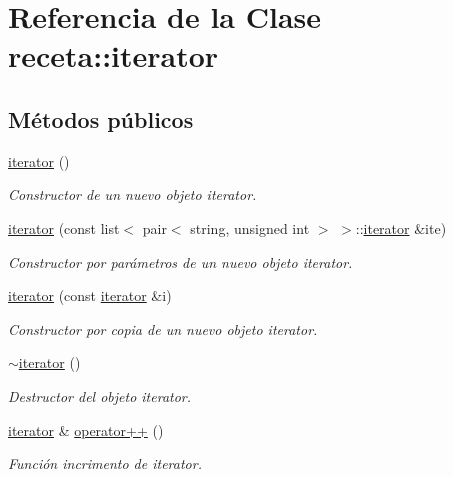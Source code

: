 \hypertarget{classreceta_1_1iterator}{}\section{Referencia de la Clase receta\+:\+:iterator}
\label{classreceta_1_1iterator}
\subsection*{Métodos públicos}
\begin{DoxyCompactItemize}
\item 
\hyperlink{classreceta_1_1iterator_a4cc712c12bb8e7ac1488e07def470a0b}{iterator} ()
\begin{DoxyCompactList}\small\item\em Constructor de un nuevo objeto iterator. \end{DoxyCompactList}\item 
\hyperlink{classreceta_1_1iterator_a3372167925372df4a8895b4337b8dcbf}{iterator} (const list$<$ pair$<$ string, unsigned int $>$ $>$\+::\hyperlink{classreceta_1_1iterator}{iterator} \&ite)
\begin{DoxyCompactList}\small\item\em Constructor por parámetros de un nuevo objeto iterator. \end{DoxyCompactList}\item 
\hyperlink{classreceta_1_1iterator_a79ccd945ca622fc03f1d0b91a3feefa0}{iterator} (const \hyperlink{classreceta_1_1iterator}{iterator} \&i)
\begin{DoxyCompactList}\small\item\em Constructor por copia de un nuevo objeto iterator. \end{DoxyCompactList}\item 
\hyperlink{classreceta_1_1iterator_a9be0aae7ef0fbf74c1af38f822615aa2}{$\sim$iterator} ()
\begin{DoxyCompactList}\small\item\em Destructor del objeto iterator. \end{DoxyCompactList}\item 
\hyperlink{classreceta_1_1iterator}{iterator} \& \hyperlink{classreceta_1_1iterator_a24fb45c8140074c203a5e08aa74a44f4}{operator++} ()
\begin{DoxyCompactList}\small\item\em Función incrimento de iterator. \end{DoxyCompactList}\item 

\end{DoxyCompactItemize}
